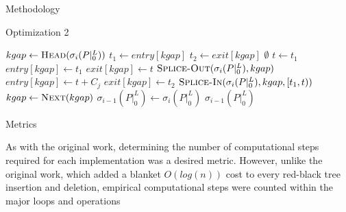\documentclass{article}
\begin{document}
\begin{section}{Methodology}
\begin{subsection}{Optimization 2}
\begin{algorithm}[H]
\begin{algorithmic}[2]
            \State \begingroup\color{red}$kgap \gets \Call{Head}{\sigma_{i}(P|_{0}^{L})}$\endgroup
            \State $t_{1} \gets entry[kgap]$
            \State $t_{2} \gets exit[kgap]$
                \State \Return $\emptyset$
              \EndIf
                \State $t \gets t_{1}$
              \EndIf
                \begingroup\color{red}
                    \State $entry[kgap] \gets t_{1}$
                    \State $exit[kgap] \gets t$
                  \Else
                    \State $\Call{Splice-Out}{\sigma_{i}(P|_{0}^{L}), kgap}$
                  \EndIf
                    \ExitWhile
                  \EndIf
                \EndIf
                \endgroup
                  \State \begingroup\color{red}$entry[kgap] \gets t + C_{j}$\endgroup
                  \State \begingroup\color{red}$exit[kgap] \gets t_{2}$\endgroup
                    \State \begingroup\color{red}$\Call{Splice-In}{\sigma_{i}(P|_{0}^{L}), kgap, [t_{1},t)}$\endgroup
                  \EndIf
                  \ExitWhile
                \EndIf
              \EndIf
                \State \begingroup\color{red}$kgap \gets \Call{Next}{kgap}$\endgroup
              \EndIf
            \EndWhile
          \EndFor
          \State $\sigma_{i-1}(P|_{0}^{L}) \gets \sigma_{i}(P|_{0}^{L})$
          \State \Return $\sigma_{i-1}(P|_{0}^{L})$
        \EndFunction
      \end{algorithmic}
      \end{algorithm}
  \end{subsection}
  \begin{subsection}{Metrics}
    \begin{paragraph}{}
      As with the original work, determining the number of computational steps required for
      each implementation was a desired metric. However, unlike the original work, which
      added a blanket $O(log(n))$ cost to every red-black tree insertion and deletion\autocite[14]{BelwalCheng},
      empirical computational steps were counted within the major loops and operations

\end{paragraph}
\end{subsection}
\end{section}
\end{document}
